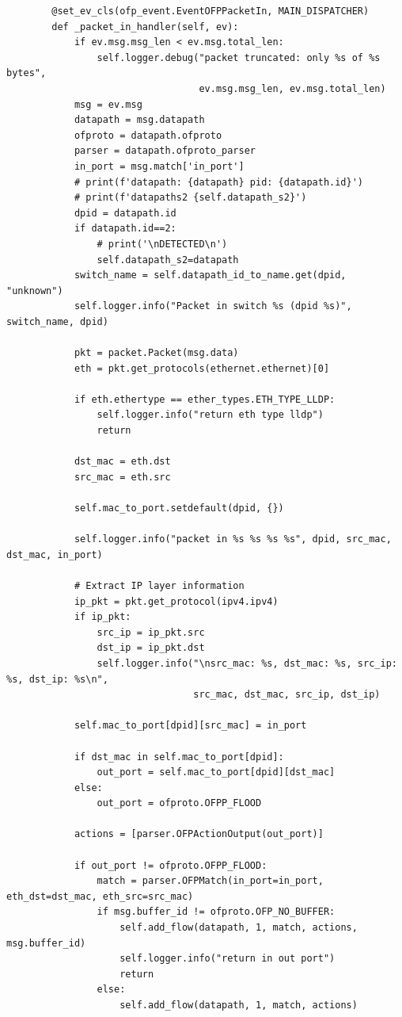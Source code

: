 \documentclass[a4paper,12pt]{article}
\begin{document}
\begin{verbatim}
        @set_ev_cls(ofp_event.EventOFPPacketIn, MAIN_DISPATCHER)
        def _packet_in_handler(self, ev):        
            if ev.msg.msg_len < ev.msg.total_len:
                self.logger.debug("packet truncated: only %s of %s bytes",
                                  ev.msg.msg_len, ev.msg.total_len)
            msg = ev.msg        
            datapath = msg.datapath
            ofproto = datapath.ofproto
            parser = datapath.ofproto_parser
            in_port = msg.match['in_port']
            # print(f'datapath: {datapath} pid: {datapath.id}')
            # print(f'datapaths2 {self.datapath_s2}')
            dpid = datapath.id
            if datapath.id==2:
                # print('\nDETECTED\n')
                self.datapath_s2=datapath
            switch_name = self.datapath_id_to_name.get(dpid, "unknown")
            self.logger.info("Packet in switch %s (dpid %s)", switch_name, dpid)
            
            pkt = packet.Packet(msg.data)
            eth = pkt.get_protocols(ethernet.ethernet)[0]
    
            if eth.ethertype == ether_types.ETH_TYPE_LLDP:
                self.logger.info("return eth type lldp")
                return
    
            dst_mac = eth.dst
            src_mac = eth.src
    
            self.mac_to_port.setdefault(dpid, {})
    
            self.logger.info("packet in %s %s %s %s", dpid, src_mac, dst_mac, in_port)
    
            # Extract IP layer information
            ip_pkt = pkt.get_protocol(ipv4.ipv4)
            if ip_pkt:
                src_ip = ip_pkt.src
                dst_ip = ip_pkt.dst
                self.logger.info("\nsrc_mac: %s, dst_mac: %s, src_ip: %s, dst_ip: %s\n",
                                 src_mac, dst_mac, src_ip, dst_ip)
    
            self.mac_to_port[dpid][src_mac] = in_port
    
            if dst_mac in self.mac_to_port[dpid]:
                out_port = self.mac_to_port[dpid][dst_mac]
            else:
                out_port = ofproto.OFPP_FLOOD
    
            actions = [parser.OFPActionOutput(out_port)]
    
            if out_port != ofproto.OFPP_FLOOD:
                match = parser.OFPMatch(in_port=in_port, eth_dst=dst_mac, eth_src=src_mac)
                if msg.buffer_id != ofproto.OFP_NO_BUFFER:
                    self.add_flow(datapath, 1, match, actions, msg.buffer_id)
                    self.logger.info("return in out port")
                    return
                else:
                    self.add_flow(datapath, 1, match, actions)
    

\end{verbatim}
\end{document}

